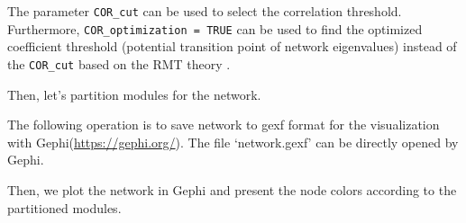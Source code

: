 \documentclass[
]{book}
\newenvironment{Shaded}{\begin{snugshade}}{\end{snugshade}}
\newcommand{\AttributeTok}[1]{\textcolor[rgb]{0.77,0.63,0.00}{#1}}
\newcommand{\CommentTok}[1]{\textcolor[rgb]{0.56,0.35,0.01}{\textit{#1}}}
\newcommand{\ConstantTok}[1]{\textcolor[rgb]{0.00,0.00,0.00}{#1}}
\newcommand{\FloatTok}[1]{\textcolor[rgb]{0.00,0.00,0.81}{#1}}
\newcommand{\FunctionTok}[1]{\textcolor[rgb]{0.00,0.00,0.00}{#1}}
\newcommand{\NormalTok}[1]{#1}
\newcommand{\SpecialCharTok}[1]{\textcolor[rgb]{0.00,0.00,0.00}{#1}}
\newcommand{\StringTok}[1]{\textcolor[rgb]{0.31,0.60,0.02}{#1}}
\begin{document}
The parameter \texttt{COR\_cut} can be used to select the correlation threshold.
Furthermore, \texttt{COR\_optimization\ =\ TRUE} can be used to find the optimized coefficient threshold (potential transition point of network eigenvalues)
instead of the \texttt{COR\_cut} based on the RMT theory \citep{Deng_Molecular_2012}.

\begin{Shaded}
\end{Shaded}

Then, let's partition modules for the network.

\begin{Shaded}
\end{Shaded}

The following operation is to save network to gexf format for the visualization with Gephi(\url{https://gephi.org/}).
The file `network.gexf' can be directly opened by Gephi.

\begin{Shaded}
\end{Shaded}

Then, we plot the network in Gephi and present the node colors according to the partitioned modules.
\end{document}
